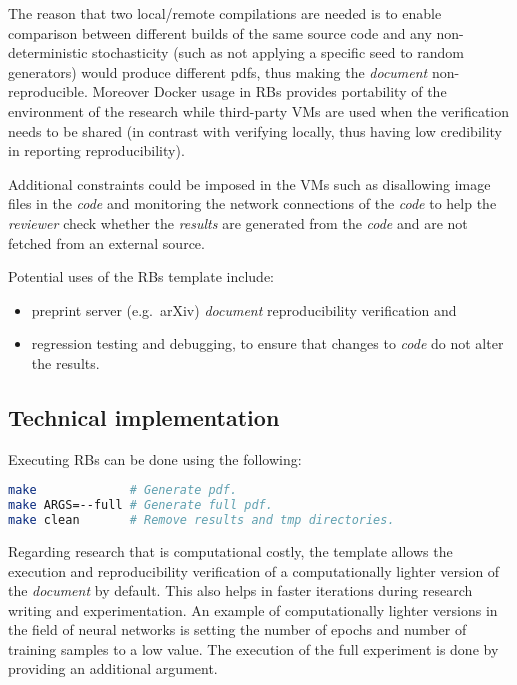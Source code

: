 \documentclass[journal]{IEEEtran}
\begin{document}
The reason that two local/remote compilations are needed is to enable comparison between different builds of the same source code and any non-deterministic stochasticity (such as not applying a specific seed to random generators) would produce different pdfs, thus making the \textit{document} non-reproducible.
Moreover Docker usage in RBs provides portability of the environment of the research while third-party VMs are used when the verification needs to be shared (in contrast with verifying locally, thus having low credibility in reporting reproducibility).

Additional constraints could be imposed in the VMs such as disallowing image files in the \textit{code} and monitoring the network connections of the \textit{code} to help the \textit{reviewer} check whether the \textit{results} are generated from the \textit{code} and are not fetched from an external source.

Potential uses of the RBs template include:
\begin{itemize}
	\item preprint server (e.g.\ arXiv) \textit{document} reproducibility verification and
	\item regression testing and debugging, to ensure that changes to \textit{code} do not alter the results.
\end{itemize}

\subsection{Technical implementation}
Executing RBs can be done using the following:
\begin{lstlisting}[language=Bash, style=lststyle, caption={Makefile call syntax from the shell.}, captionpos=b]
make             # Generate pdf.
make ARGS=--full # Generate full pdf.
make clean       # Remove results and tmp directories.
\end{lstlisting}

Regarding research that is computational costly, the template allows the execution and reproducibility verification of a computationally lighter version of the \textit{document} by default.
This also helps in faster iterations during research writing and experimentation.
An example of computationally lighter versions in the field of neural networks is setting the number of epochs and number of training samples to a low value.
The execution of the full experiment is done by providing an additional argument.
\end{document}
